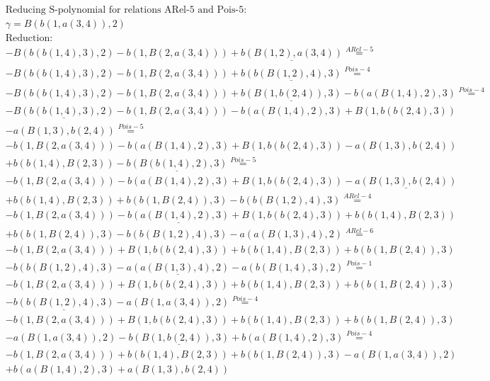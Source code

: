 \documentclass[11pt]{amsart}
\begin{document}
\begin{align*} 
& \text{Reducing S-polynomial for relations ARel-5 and Pois-5:} \\ 
& \gamma = B(b(1,a(3,4)),2) \\ 
& \text{Reduction}: \\& - B(b(b(1,4),3),2) - b(1,B(2,a(3,4))) + \underline{b(B(1,2),a(3,4))} \stackrel{ ARel-5 }{=}  \\ 
& - B(b(b(1,4),3),2) - b(1,B(2,a(3,4))) + \underline{b(b(B(1,2),4),3)} \stackrel{ Pois-4 }{=}  \\ 
& - B(b(b(1,4),3),2) - b(1,B(2,a(3,4))) + \underline{b(B(1,b(2,4)),3)} - b(a(B(1,4),2),3) \stackrel{ Pois-4 }{=}  \\ 
& - \underline{B(b(b(1,4),3),2)} - b(1,B(2,a(3,4))) - b(a(B(1,4),2),3) + B(1,b(b(2,4),3))\\ 
 &  - a(B(1,3),b(2,4)) \stackrel{ Pois-5 }{=}  \\ 
& - b(1,B(2,a(3,4))) - b(a(B(1,4),2),3) + B(1,b(b(2,4),3)) - a(B(1,3),b(2,4))\\ 
 &  + b(b(1,4),B(2,3)) - \underline{b(B(b(1,4),2),3)} \stackrel{ Pois-5 }{=}  \\ 
& - b(1,B(2,a(3,4))) - b(a(B(1,4),2),3) + B(1,b(b(2,4),3)) - \underline{a(B(1,3),b(2,4))}\\ 
 &  + b(b(1,4),B(2,3)) + b(b(1,B(2,4)),3) - b(b(B(1,2),4),3) \stackrel{ ARel-4 }{=}  \\ 
& - b(1,B(2,a(3,4))) - \underline{b(a(B(1,4),2),3)} + B(1,b(b(2,4),3)) + b(b(1,4),B(2,3))\\ 
 &  + b(b(1,B(2,4)),3) - b(b(B(1,2),4),3) - a(a(B(1,3),4),2) \stackrel{ ARel-6 }{=}  \\ 
& - b(1,B(2,a(3,4))) + B(1,b(b(2,4),3)) + b(b(1,4),B(2,3)) + b(b(1,B(2,4)),3)\\ 
 &  - b(b(B(1,2),4),3) - \underline{a(a(B(1,3),4),2)} - a(b(B(1,4),3),2) \stackrel{ Pois-1 }{=}  \\ 
& - b(1,B(2,a(3,4))) + B(1,b(b(2,4),3)) + b(b(1,4),B(2,3)) + b(b(1,B(2,4)),3)\\ 
 &  - \underline{b(b(B(1,2),4),3)} - a(B(1,a(3,4)),2) \stackrel{ Pois-4 }{=}  \\ 
& - b(1,B(2,a(3,4))) + B(1,b(b(2,4),3)) + b(b(1,4),B(2,3)) + b(b(1,B(2,4)),3)\\ 
 &  - a(B(1,a(3,4)),2) - \underline{b(B(1,b(2,4)),3)} + b(a(B(1,4),2),3) \stackrel{ Pois-4 }{=}  \\ 
& - b(1,B(2,a(3,4))) + b(b(1,4),B(2,3)) + b(b(1,B(2,4)),3) - a(B(1,a(3,4)),2)\\ 
 &  + b(a(B(1,4),2),3) + a(B(1,3),b(2,4))\\ 
\end{align*} 
 
\end{document}
